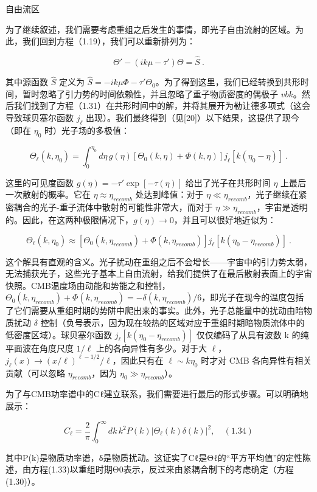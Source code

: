 自由流区

为了继续叙述，我们需要考虑重组之后发生的事情，即光子自由流射的区域。为此，我们回到方程（1.19），我们可以重新排列为：

\[ \Theta' - (ik\mu - \tau')\Theta = \hat{S} ~. \]

其中源函数 \( \hat{S} \) 定义为 \( \hat{S} = -ik\mu\Phi - \tau'\Theta_0 \)。为了得到这里，我们已经转换到共形时间，暂时忽略了引力势的时间依赖性，并且忽略了重子物质密度的偶极子 \( vbk \)。然后我们找到了方程（1.31）在共形时间中的解，并将其展开为勒让德多项式（这会导致球贝塞尔函数 \( j_\ell \) 出现）。我们最终得到（见[20]）以下结果，这提供了现今（即在 \( \eta_0 \) 时）光子场的多极值：

\[ \Theta_\ell(k, \eta_0) = \int_0^{\eta_0} d\eta \, g(\eta) \left[ \Theta_0(k, \eta) + \Phi(k, \eta) \right] j_\ell[k(\eta_0 - \eta)] ~. \]

这里的可见度函数 \( g(\eta) = -\tau' \exp[-\tau(\eta)] \) 给出了光子在共形时间 \( \eta \) 上最后一次散射的概率。它在 \( \eta \approx \eta_{recomb} \) 处达到峰值：对于 \( \eta \ll \eta_{recomb} \)，光子继续在紧密耦合的光子-重子流体中散射的可能性非常大，而对于 \( \eta \gg \eta_{recomb} \)，宇宙是透明的。因此，在这两种极限情况下，\( g(\eta) \to 0 \)，并且可以很好地近似为：

\[ \Theta_\ell(k, \eta_0) \approx \left[ \Theta_0(k, \eta_{recomb}) + \Phi(k, \eta_{recomb}) \right] j_\ell[k(\eta_0 - \eta_{recomb})] ~. \]

这个解具有直观的含义。光子扰动在重组之后不会增长——宇宙中的引力势太弱，无法捕获光子，这些光子基本上自由流射，给我们提供了在最后散射表面上的宇宙快照。CMB温度场由动能和势能之和控制，\( \Theta_0(k, \eta_{recomb}) + \Phi(k, \eta_{recomb}) = -\delta(k, \eta_{recomb})/6 \)，即光子在现今的温度包括了它们需要从重组时期的势阱中爬出来的事实。此外，光子总能量中的扰动由暗物质扰动 \( \delta \) 控制（负号表示，因为现在较热的区域对应于重组时期暗物质流体中的低密度区域）。球贝塞尔函数 \( j_\ell[k(\eta_0 - \eta_{recomb})] \) 仅仅编码了从具有波数 k 的纯平面波在角度尺度 \( 1/\ell \) 上的各向异性有多少。对于大 \( \ell \)，\( j_\ell(x) \to (x/\ell)^{\ell-1/2}/\ell \)，因此只有在 \( \ell \sim k\eta_0 \) 时才对 CMB 各向异性有相关贡献（可以忽略 \( \eta_{recomb} \)，因为 \( \eta_0 \gg \eta_{recomb} \)）。

为了与CMB功率谱中的Cℓ建立联系，我们需要进行最后的形式步骤。可以明确地展示：

\[ C_ℓ = \frac{2}{\pi} \int_0^\infty dk \, k^2 P(k) \left| \Theta_ℓ(k) \delta(k) \right|^2, \quad (1.34) \]

其中P(k)是物质功率谱，δ是物质扰动。这证实了Cℓ是Θℓ的“平方平均值”的定性陈述，由方程(1.33)以重组时期Θ0表示，反过来由紧耦合制下的考虑确定（方程(1.30)）。


